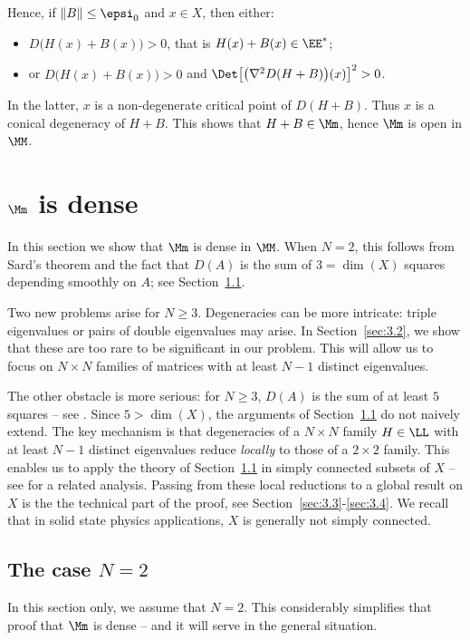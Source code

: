 Hence, if $\| B \| \leq \epsi_0$ and $x \in X$, then either:
\begin{itemize}
\item $D \bigl( H(x) + B(x)\bigr) > 0$, that is $H(x) + B(x) \in \EE^*$;
\item or $D \bigl( H(x) + B(x)\bigr) > 0$ and $\Det\bigl[ \bigl(\nabla^2 D(H+B)\bigr)(x) \bigr]^2 >0$.
\end{itemize}
In the latter, $x$ is a non-degenerate critical point of $D(H+B)$. Thus $x$ is a conical degeneracy of $H+B$. This shows that $H+B \in \Mm$, hence $\Mm$ is open in $\MM$.

\section{\texorpdfstring{$\Mm$}{M} is dense}\label{sec:3}

In this section we show that $\Mm$ is dense in $\MM$. When $N = 2$, this follows from Sard's theorem and the fact that $D(A)$ is the sum of $3=\dim(X)$ squares depending smoothly on $A$; see Section~\ref{sec:3.1}.

Two new problems arise for $N \geq 3$. Degeneracies can be more intricate: triple eigenvalues or pairs of double eigenvalues may arise. In Section~\ref{sec:3.2}, we show that these are too rare to be significant in our problem. This will allow us to focus on $N \times N$ families of matrices with at least $N-1$ distinct eigenvalues.

The other obstacle is more serious: for $N \geq 3$, $D(A)$ is the sum of at least $5$ squares -- see \cite{D11}. Since $5 > \dim(X)$, the arguments of Section~\ref{sec:3.1} do not naively extend. The key mechanism is that degeneracies of a $N \times N$ family $H \in \LL$ with at least $N-1$ distinct eigenvalues reduce \textit{locally} to those of a $2 \times 2$ family. This enables us to apply the theory of Section~\ref{sec:3.1} in simply connected subsets of $X$ -- see \cite[\S4]{DP12} for a related analysis. Passing from these local reductions to a global result on $X$ is the the technical part of the proof, see Section~\ref{sec:3.3}-\ref{sec:3.4}. We recall that in solid state physics applications, $X$ is generally not simply connected.

\subsection{The case $N=2$}\label{sec:3.1} In this section only, we assume that $N=2$. This considerably simplifies that proof that $\Mm$ is dense -- and it will serve in the general situation.

